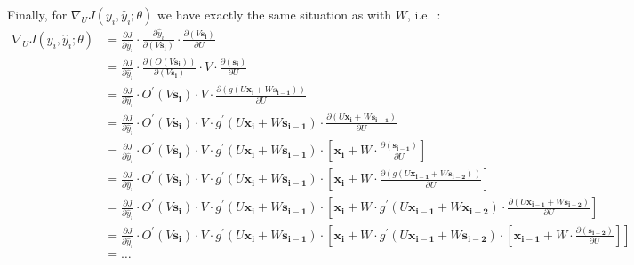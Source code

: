 Finally, for $\nabla_U J(y_i, \hat{y}_i ; \theta)$ we have exactly the same situation as with $W$, i.e.\ :
\begingroup
\allowdisplaybreaks
{\setlength{\jot}{5pt}
\begin{align*}
\nabla_U J(y_i, \hat{y}_i ; \theta)& = \frac{\partial J}{\partial \hat{y}_i}
\cdot \frac{\partial \hat{y}_i}{\partial (V \boldsymbol{s_i})} \cdot \frac{\partial (V \boldsymbol{s_i})}{\partial U} \\
&= \frac{\partial J}{\partial \hat{y}_i} \cdot \frac{ \partial ( O(V\boldsymbol{s_i}))}{\partial (V\boldsymbol{s_i})}
\cdot V \cdot \frac{\partial (\boldsymbol{s_i})}{\partial U} \\
&= \frac{\partial J}{\partial \hat{y}_i} \cdot O^\prime(V \boldsymbol{s_i}) \cdot V
\cdot \frac{\partial (g(U \boldsymbol{x_i} + W \boldsymbol{s_{i-1}}))} {\partial U} \\
&= \frac{\partial J}{\partial \hat{y}_i} \cdot O^\prime(V \boldsymbol{s_i}) \cdot V
\cdot g^\prime(U \boldsymbol{x_i} + W \boldsymbol{s_{i-1}})
\cdot \frac{\partial (U \boldsymbol{x_i} + W \boldsymbol{s_{i-1}})} {\partial U} \\
& = \frac{\partial J}{\partial \hat{y}_i} \cdot O^\prime(V \boldsymbol{s_i}) \cdot V \cdot g^\prime(U \boldsymbol{x_i}
+ W \boldsymbol{s_{i-1}}) \cdot \left[\boldsymbol{x_{i}}
+ W \cdot \frac{\partial(\boldsymbol{s_{i-1}})} {\partial U} \right] \\
& = \frac{\partial J}{\partial \hat{y}_i} \cdot O^\prime(V \boldsymbol{s_i}) \cdot V \cdot g^\prime(U \boldsymbol{x_i}
+ W \boldsymbol{s_{i-1}}) \cdot \left[\boldsymbol{x_{i}} + W \cdot \frac{\partial (g(U\boldsymbol{x_{i-1}}
+ W \boldsymbol{s_{i-2}}))} {\partial U}\right] \\
& = \frac{\partial J}{\partial \hat{y}_i} \cdot O^\prime(V\boldsymbol{s_i}) \cdot V \cdot g^\prime(U\boldsymbol{x_i}
+ W \boldsymbol{s_{i-1}}) \cdot \left[\boldsymbol{x_{i}} + W \cdot g^\prime (U\boldsymbol{x_{i-1}}
+ W \boldsymbol{x_{i-2}}) \cdot \frac{\partial(U \boldsymbol{x_{i-1}} + W\boldsymbol{s_{i-2}})} {\partial U} \right] \\
&= \frac{\partial J}{\partial \hat{y}_i} \cdot O^\prime(V\boldsymbol{s_i}) \cdot V \cdot g^\prime(U\boldsymbol{x_i}
+ W \boldsymbol{s_{i-1}}) \cdot \left[\boldsymbol{x_{i}} + W \cdot g^\prime (U\boldsymbol{x_{i-1}}
+ W \boldsymbol{s_{i-2}}) \cdot \left[\boldsymbol{x_{i-1}}
+ W \cdot \frac{\partial(\boldsymbol{s_{i-2}})} {\partial U} \right] \right] \\
& = \ldots
\end{align*}}
\endgroup

